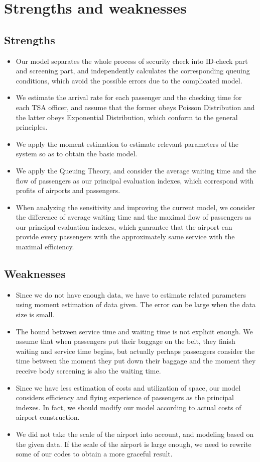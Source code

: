 \documentclass{mcmthesis}
\begin{document}
\section{Strengths and weaknesses}
\subsection{Strengths}
\begin{itemize}
\item Our model separates the whole process of security check into ID-check part and screening part, and independently calculates the corresponding queuing conditions, which avoid the possible errors due to the complicated model.
\item We estimate the arrival rate for each passenger and the checking time for each TSA officer, and assume that the former obeys Poisson Distribution and the latter obeys Exponential Distribution, which conform to the general principles.
\item We apply the moment estimation to estimate relevant parameters of the system so as to obtain the basic model.
\item We apply the Queuing Theory, and consider the average waiting time and the flow of passengers as our principal evaluation indexes, which correspond with profits of airports and passengers.
\item When analyzing the sensitivity and improving the current model, we consider the difference of average waiting time and the maximal flow of passengers as our principal evaluation indexes, which guarantee that the airport can provide every passengers with the approximately same service with the maximal efficiency.
\end{itemize}
\subsection{Weaknesses}
\begin{itemize}
\item Since we do not have enough data, we have to estimate related parameters using moment estimation of data given. The error can be large when the data size is small.
\item The bound between service time and waiting time is not explicit enough. We assume that when passengers put their baggage on the belt, they finish waiting and service time begins, but actually perhaps passengers consider the time between the moment they put down their baggage and the moment they receive body screening is also the waiting time.\item Since we have less estimation of costs and utilization of space, our model considers efficiency and flying experience of passengers as the principal indexes. In fact, we should modify our model according to actual costs of airport construction.
\item We did not take the scale of the airport into account, and modeling based on the given data. If the scale of the airport is large enough, we need to rewrite some of our codes to obtain a more graceful result.
\end{itemize}
\end{document}
